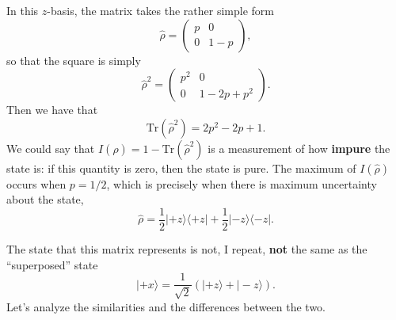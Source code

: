 \documentclass[a4]{article}
\begin{document}
In this $z$-basis, the matrix takes the rather simple form
\begin{equation*}
  \hat{\rho} =
  \begin{pmatrix}
    p & 0\\
    0 & 1-p
  \end{pmatrix},
\end{equation*}
so that the square is simply
\begin{equation*}
  \hat{\rho}^2 =
  \begin{pmatrix}
    p^2 & 0\\
    0 & 1-2p+p^2
  \end{pmatrix}.
\end{equation*}
Then we have that
\begin{equation*}
  \mathrm{Tr}\left(\hat{\rho}^2\right) = 2p^2 -2p + 1.
\end{equation*}
We could say that $I(\hat{\rho}) = 1-\mathrm{Tr}\left(\hat{\rho}^2\right)$ is a measurement of how \textbf{impure} the
state is: if this quantity is zero, then the state is pure. The maximum of $I(\hat{\rho})$ occurs when $p=1/2$, which
is precisely when there is maximum uncertainty about the state, 
\begin{equation*}
  \hat{\rho} = \frac{1}{2}|+z\rangle\langle +z | + \frac{1}{2}|-z\rangle\langle -z |.
\end{equation*}

The state that this matrix represents is not, I repeat, \textbf{not} the same as the ``superposed'' state
\begin{equation*}
  |+x\rangle = \frac{1}{\sqrt{2}}\left(|+z\rangle + |-z\rangle\right).
\end{equation*}
Let's analyze the similarities and the differences between the two.
\end{document}
